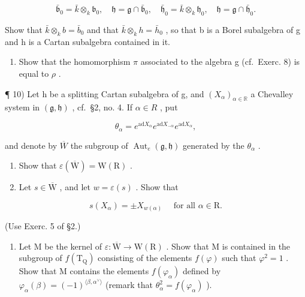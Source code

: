 \[
\bar {\mathfrak {b}} _ {0} = \bar {k} \otimes_ {k} \mathfrak {b} _ {0}, \quad \mathfrak {h} = \mathfrak {g} \cap \bar {\mathfrak {b}} _ {0}, \quad \bar {\mathfrak {h}} _ {0} = \bar {k} \otimes_ {k} \mathfrak {h} _ {0}, \quad \mathfrak {h} = \mathfrak {g} \cap \bar {\mathfrak {h}} _ {0}.
\]

Show that \(\bar{k}\otimes_{k}b=\bar{b}_{0}\) and that \(\bar{k}\otimes_{k}h=\bar{h}_{0}\) , so that b is a Borel subalgebra of g and h is a Cartan subalgebra contained in it.

\begin{enumerate}
\def\labelenumi{\alph{enumi})}
\setcounter{enumi}{2}
\tightlist
\item
  Show that the homomorphism \(\pi\) associated to the algebra g (cf.~Exerc. 8) is equal to \(\rho\) .
\end{enumerate}

¶ 10) Let h be a splitting Cartan subalgebra of g, and \((X_{\alpha})_{\alpha\in\mathbb{R}}\) a Chevalley system in \((\mathfrak{g},\mathfrak{h})\) , cf.~§2, no. 4. If \(\alpha\in R\) , put

\[
\theta_ {\alpha} = e ^ {\mathrm{ad} X _ {\alpha}} e ^ {\mathrm{ad} X _ {- \alpha}} e ^ {\mathrm{ad} X _ {\alpha}},
\]

and denote by \(\overline{W}\) the subgroup of \(\operatorname{Aut}_{e}(\mathfrak{g},\mathfrak{h})\) generated by the \(\theta_{\alpha}\) .

\begin{enumerate}
\def\labelenumi{\alph{enumi})}
\item
  Show that \(\varepsilon (\overline{\mathrm{W}}) = \mathrm{W}(\mathrm{R})\) .
\item
  Let \(s \in \overline{\mathrm{W}}\) , and let \(w = \varepsilon(s)\) . Show that
\end{enumerate}

\[
s (X _ {\alpha}) = \pm X _ {w (\alpha)} \quad \text {   for   all   } \alpha \in \mathrm{R}.
\]

(Use Exerc. 5 of §2.)

\begin{enumerate}
\def\labelenumi{\alph{enumi})}
\setcounter{enumi}{2}
\tightlist
\item
  Let M be the kernel of \(\varepsilon : \overline{\mathrm{W}} \to \mathrm{W}(\mathrm{R})\) . Show that M is contained in the subgroup of \(f(\mathrm{T}_{\mathrm{Q}})\) consisting of the elements \(f(\varphi)\) such that \(\varphi^2 = 1\) . Show that M contains the elements \(f(\varphi_{\alpha})\) defined by \(\varphi_{\alpha}(\beta) = (-1)^{\langle \beta, \alpha^{\vee} \rangle}\) (remark that \(\theta_{\alpha}^{2} = f(\varphi_{\alpha})\) ).
\end{enumerate}

